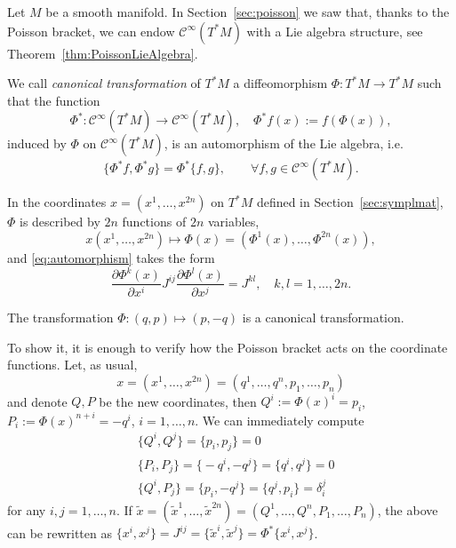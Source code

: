 \documentclass[english,fontsize=11pt,paper=a5,oneside]{scrbook}
\newcommand{\cC}{\mathcal{C}}
\theoremstyle{definition}
\newenvironment{example}
  {\pushQED{\qed}\renewcommand{\qedsymbol}{$\lozenge$}\examplex}
  {\popQED\endexamplex}
\begin{document}
Let $M$ be a smooth manifold. In Section~\ref{sec:poisson} we saw that, thanks to the Poisson bracket, we can endow $\cC^\infty(T^*M)$ with a Lie algebra structure, see Theorem~\ref{thm:PoissonLieAlgebra}.

\begin{tcolorbox}
    We call \emph{canonical transformation} of $T^*M$ a diffeomorphism $\Phi: T^*M\to T^*M$ such that the function
    \begin{equation}
        \Phi^*: \cC^\infty(T^*M) \to \cC^\infty(T^*M),\quad
        \Phi^* f(x) := f(\Phi(x)),
    \end{equation}
    induced by $\Phi$ on $\cC^\infty(T^*M)$, is an automorphism of the Lie algebra, i.e.
    \begin{equation}\label{eq:automorphism}
        \big\{\Phi^* f, \Phi^* g\big\} = \Phi^*\big\{f,g\big\}, \qquad\forall f,g\in\cC^\infty(T^*M).
    \end{equation}
\end{tcolorbox}

In the coordinates $x=(x^1, \ldots, x^{2n})$ on $T^*M$ defined in Section~\ref{sec:symplmat}, $\Phi$ is described by $2n$ functions of $2n$ variables,
\begin{equation}
    x(x^1,\ldots,x^{2n}) \mapsto \Phi(x) = \left(\Phi^1(x), \ldots, \Phi^{2n}(x)\right),
\end{equation}
and \eqref{eq:automorphism} takes the form
\begin{equation}\label{eq:cantrafocoord}
    \frac{\partial\Phi^k(x)}{\partial x^i} J^{ij} \frac{\partial\Phi^l(x)}{\partial x^j} = J^{kl},\quad k,l=1,\ldots,2n.
\end{equation}

\begin{example}
    The transformation $\Phi: (q,p) \mapsto (p, -q)$ is a canonical transformation.

    To show it, it is enough to verify how the Poisson bracket acts on the coordinate functions. Let, as usual, \begin{equation}
        x=(x^1, \ldots,x^{2n})=(q^1,\ldots,q^n,p_1,\ldots,p_n)
    \end{equation}
    and denote $Q,P$ be the new coordinates, then $Q^i := \Phi(x)^i = p_i$, $P_i := \Phi(x)^{n+i} = -q^i$, $i=1,\ldots, n$.
    We can immediately compute
    \begin{align}
        &\big\{Q^i, Q^j\big\} = \big\{p_i, p_j\big\} = 0\\
        &\big\{P_i, P_j\big\} = \big\{-q^i, -q^j\big\} = \big\{q^i, q^j\big\} = 0\\
        &\big\{Q^i, P_j\big\} = \big\{p_i, -q^j\big\} = \big\{q^j, p_i\big\} = \delta^j_i
    \end{align}
    for any $i,j=1,\ldots,n$.
    If $\widetilde x = (\widetilde x^1, \ldots, \widetilde x^{2n})= (Q^1, \ldots, Q^n, P_1,\ldots,P_n)$, the above can be rewritten as $\big\{x^i, x^j\big\} = J^{ij} = \big\{\widetilde x^i, \widetilde x^j\big\} = \Phi^* \big\{x^i, x^j\big\}$.
\end{example}
\end{document}
